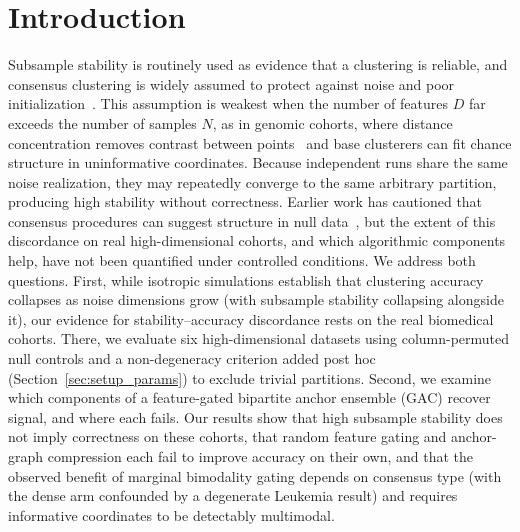 \documentclass[pdflatex,sn-mathphys-num]{sn-jnl}
\theoremstyle{thmstyleone}
\theoremstyle{thmstyletwo}
\theoremstyle{thmstylethree}
\begin{document}

\maketitle

\section{Introduction}\label{sec:intro}

Subsample stability is routinely used as evidence that a clustering is reliable, and consensus clustering is widely assumed to protect against noise and poor initialization~\cite{fred2005combining}. This assumption is weakest when the number of features $D$ far exceeds the number of samples $N$, as in genomic cohorts, where distance concentration removes contrast between points~\cite{beyer1999nearest} and base clusterers can fit chance structure in uninformative coordinates. Because independent runs share the same noise realization, they may repeatedly converge to the same arbitrary partition, producing high stability without correctness. Earlier work has cautioned that consensus procedures can suggest structure in null data~\cite{senbabaoglu2014critical}, but the extent of this discordance on real high-dimensional cohorts, and which algorithmic components help, have not been quantified under controlled conditions. We address both questions. First, while isotropic simulations establish that clustering accuracy collapses as noise dimensions grow (with subsample stability collapsing alongside it), our evidence for stability--accuracy discordance rests on the real biomedical cohorts. There, we evaluate six high-dimensional datasets using column-permuted null controls and a non-degeneracy criterion added post hoc (Section~\ref{sec:setup_params}) to exclude trivial partitions. Second, we examine which components of a feature-gated bipartite anchor ensemble (GAC) recover signal, and where each fails. Our results show that high subsample stability does not imply correctness on these cohorts, that random feature gating and anchor-graph compression each fail to improve accuracy on their own, and that the observed benefit of marginal bimodality gating depends on consensus type (with the dense arm confounded by a degenerate Leukemia result) and requires informative coordinates to be detectably multimodal.
\end{document}
